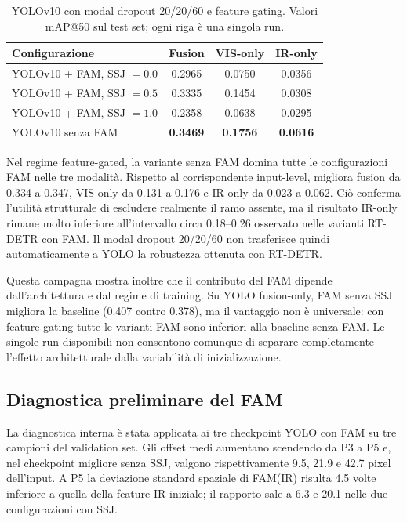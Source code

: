 \documentclass[a4paper,11pt]{article}
\begin{document}
\begin{table}[H]
\centering
\caption{YOLOv10 con modal dropout 20/20/60 e feature gating. Valori mAP@50 sul test set; ogni riga è una singola run.}
\label{tab:yolo_md_feature}
\begin{tabular}{lccc}
\toprule
Configurazione & Fusion & VIS-only & IR-only \\
\midrule
YOLOv10 + FAM, SSJ $=0.0$ & 0.2965 & 0.0750 & 0.0356 \\
YOLOv10 + FAM, SSJ $=0.5$ & 0.3335 & 0.1454 & 0.0308 \\
YOLOv10 + FAM, SSJ $=1.0$ & 0.2358 & 0.0638 & 0.0295 \\
YOLOv10 senza FAM & \textbf{0.3469} & \textbf{0.1756} & \textbf{0.0616} \\
\bottomrule
\end{tabular}
\end{table}

Nel regime feature-gated, la variante senza FAM domina tutte le configurazioni FAM nelle tre modalità. Rispetto al corrispondente input-level, migliora fusion da 0.334 a 0.347, VIS-only da 0.131 a 0.176 e IR-only da 0.023 a 0.062. Ciò conferma l'utilità strutturale di escludere realmente il ramo assente, ma il risultato IR-only rimane molto inferiore all'intervallo circa 0.18--0.26 osservato nelle varianti RT-DETR con FAM. Il modal dropout 20/20/60 non trasferisce quindi automaticamente a YOLO la robustezza ottenuta con RT-DETR.

Questa campagna mostra inoltre che il contributo del FAM dipende dall'architettura e dal regime di training. Su YOLO fusion-only, FAM senza SSJ migliora la baseline (0.407 contro 0.378), ma il vantaggio non è universale: con feature gating tutte le varianti FAM sono inferiori alla baseline senza FAM. Le singole run disponibili non consentono comunque di separare completamente l'effetto architetturale dalla variabilità di inizializzazione.

\subsection{Diagnostica preliminare del FAM}

La diagnostica interna è stata applicata ai tre checkpoint YOLO con FAM su tre campioni del validation set. Gli offset medi aumentano scendendo da P3 a P5 e, nel checkpoint migliore senza SSJ, valgono rispettivamente 9.5, 21.9 e 42.7 pixel dell'input. A P5 la deviazione standard spaziale di FAM(IR) risulta 4.5 volte inferiore a quella della feature IR iniziale; il rapporto sale a 6.3 e 20.1 nelle due configurazioni con SSJ.
\end{document}
